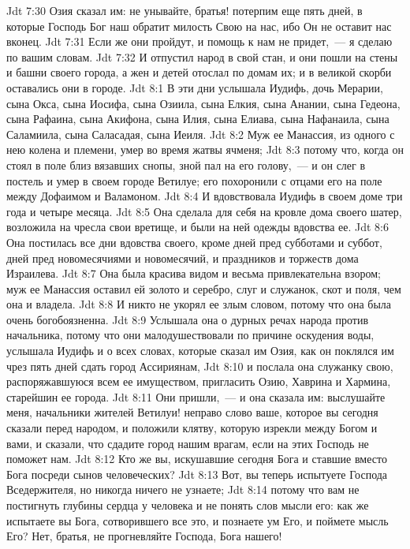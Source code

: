 \vs Jdt 7:30 Озия сказал им: не унывайте, братья! потерпим еще пять дней, в которые Господь Бог наш обратит милость Свою на нас, ибо Он не оставит нас вконец.
\vs Jdt 7:31 Если же они пройдут, и помощь к нам не придет,~--- я сделаю по вашим словам.
\vs Jdt 7:32 И отпустил народ в свой стан, и они пошли на стены и башни своего города, а жен и детей отослал по домам их; и в великой скорби оставались они в городе.
\vs Jdt 8:1 В эти дни услышала Иудифь, дочь Мерарии, сына Окса, сына Иосифа, сына Озиила, сына Елкия, сына Анании, сына Гедеона, сына Рафаина, сына Акифона, сына Илия, сына Елиава, сына Нафанаила, сына Саламиила, сына Саласадая, сына Иеиля.
\vs Jdt 8:2 Муж ее Манассия, из одного с нею колена и племени, умер во время жатвы ячменя;
\vs Jdt 8:3 потому что, когда он стоял в поле близ вязавших снопы, зной пал на его голову,~--- и он слег в постель и умер в своем городе Ветилуе; его похоронили с отцами его на поле между Дофаимом и Валамоном.
\vs Jdt 8:4 И вдовствовала Иудифь в своем доме три года и четыре месяца.
\vs Jdt 8:5 Она сделала для себя на кровле дома своего шатер, возложила на чресла свои вретище, и были на ней одежды вдовства ее.
\vs Jdt 8:6 Она постилась все дни вдовства своего, кроме дней пред субботами и суббот, дней пред новомесячиями и новомесячий, и праздников и торжеств дома Израилева.
\vs Jdt 8:7 Она была красива видом и весьма привлекательна взором; муж ее Манассия оставил ей золото и серебро, слуг и служанок, скот и поля, чем она и владела.
\vs Jdt 8:8 И никто не укорял ее злым словом, потому что она была очень богобоязненна.
\vs Jdt 8:9 Услышала она о дурных речах народа против начальника, потому что они малодушествовали по причине оскудения воды, услышала Иудифь и о всех словах, которые сказал им Озия, как он поклялся им чрез пять дней сдать город Ассириянам,
\vs Jdt 8:10 и послала она служанку свою, распоряжавшуюся всем ее имуществом, пригласить Озию, Хаврина и Хармина, старейшин ее города.
\rsbpar\vs Jdt 8:11 Они пришли,~--- и она сказала им: выслушайте меня, начальники жителей Ветилуи! неправо слово ваше, которое вы сегодня сказали перед народом, и положили клятву, которую изрекли между Богом и вами, и сказали, что сдадите город нашим врагам, если на этих  Господь не поможет нам.
\vs Jdt 8:12 Кто же вы, искушавшие сегодня Бога и ставшие вместо Бога посреди сынов человеческих?
\vs Jdt 8:13 Вот, вы теперь испытуете Господа Вседержителя, но никогда ничего не узнаете;
\vs Jdt 8:14 потому что вам не постигнуть глубины сердца у человека и не понять слов мысли его: как же испытаете вы Бога, сотворившего все это, и познаете ум Его, и поймете мысль Его? Нет, братья, не прогневляйте Господа, Бога нашего!
